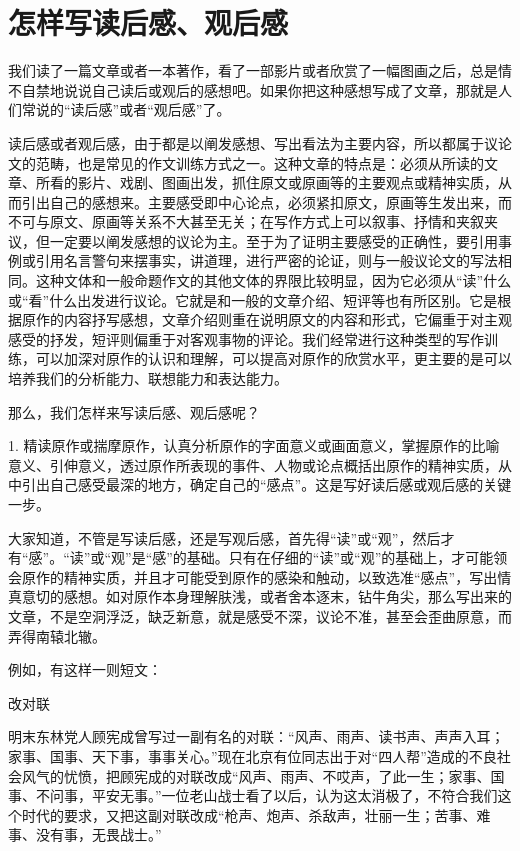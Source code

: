 \section{怎样写读后感、观后感}

我们读了一篇文章或者一本著作，看了一部影片或者欣赏了一幅图画之后，总是情不自禁地说说自己读后或观后的感想吧。如果你把这种感想写成了文章，那就是人们常说的“读后感”或者“观后感”了。

读后感或者观后感，由于都是以阐发感想、写出看法为主要内容，所以都属于议论文的范畴，也是常见的作文训练方式之一。这种文章的特点是：必须从所读的文章、所看的影片、戏剧、图画出发，抓住原文或原画等的主要观点或精神实质，从而引出自己的感想来。主要感受即中心论点，必须紧扣原文，原画等生发出来，而不可与原文、原画等关系不大甚至无关；在写作方式上可以叙事、抒情和夹叙夹议，但一定要以阐发感想的议论为主。至于为了证明主要感受的正确性，要引用事例或引用名言警句来摆事实，讲道理，进行严密的论证，则与一般议论文的写法相同。这种文体和一般命题作文的其他文体的界限比较明显，因为它必须从“读”什么或“看”什么出发进行议论。它就是和一般的文章介绍、短评等也有所区别。它是根据原作的内容抒写感想，文章介绍则重在说明原文的内容和形式，它偏重于对主观感受的抒发，短评则偏重于对客观事物的评论。我们经常进行这种类型的写作训练，可以加深对原作的认识和理解，可以提高对原作的欣赏水平，更主要的是可以培养我们的分析能力、联想能力和表达能力。

那么，我们怎样来写读后感、观后感呢？

1. 精读原作或揣摩原作，认真分析原作的字面意义或画面意义，掌握原作的比喻意义、引伸意义，透过原作所表现的事件、人物或论点概括出原作的精神实质，从中引出自己感受最深的地方，确定自己的“感点”。这是写好读后感或观后感的关键一步。

大家知道，不管是写读后感，还是写观后感，首先得“读”或“观”，然后才有“感”。“读”或“观”是“感”的基础。只有在仔细的“读”或“观”的基础上，才可能领会原作的精神实质，并且才可能受到原作的感染和触动，以致选准“感点”，写出情真意切的感想。如对原作本身理解肤浅，或者舍本逐末，钻牛角尖，那么写出来的文章，不是空洞浮泛，缺乏新意，就是感受不深，议论不准，甚至会歪曲原意，而弄得南辕北辙。

例如，有这样一则短文：
\begin{center}
	改\hspace{1em}对\hspace{1em}联
\end{center}

明末东林党人顾宪成曾写过一副有名的对联：“风声、雨声、读书声、声声入耳；家事、国事、天下事，事事关心。”现在北京有位同志出于对“四人帮”造成的不良社会风气的忧愤，把顾宪成的对联改成“风声、雨声、不哎声，了此一生；家事、国事、不问事，平安无事。”一位老山战士看了以后，认为这太消极了，不符合我们这个时代的要求，又把这副对联改成“枪声、炮声、杀敌声，壮丽一生；苦事、难事、没有事，无畏战士。”

